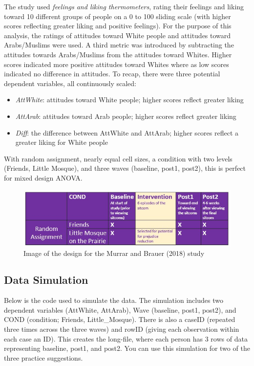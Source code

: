 \documentclass[
  11pt,
]{book}
\providecommand{\tightlist}{%
  \setlength{\itemsep}{0pt}\setlength{\parskip}{0pt}}
\begin{document}
The study used \emph{feelings and liking thermometers}, rating their feelings and liking toward 10 different groups of people on a 0 to 100 sliding scale (with higher scores reflecting greater liking and positive feelings). For the purpose of this analysis, the ratings of attitudes toward White people and attitudes toward Arabs/Muslims were used. A third metric was introduced by subtracting the attitudes towards Arabs/Muslims from the attitudes toward Whites. Higher scores indicated more positive attitudes toward Whites where as low scores indicated no difference in attitudes. To recap, there were three potential dependent variables, all continuously scaled:

\begin{itemize}
\tightlist
\item
  \emph{AttWhite}: attitudes toward White people; higher scores reflect greater liking
\item
  \emph{AttArab}: attitudes toward Arab people; higher scores reflect greater liking
\item
  \emph{Diff}: the difference between AttWhite and AttArab; higher scores reflect a greater liking for White people
\end{itemize}

With random assignment, nearly equal cell sizes, a condition with two levels (Friends, Little Mosque), and three waves (baseline, post1, post2), this is perfect for mixed design ANOVA.

\begin{figure}
\centering
\includegraphics{images/mixed/Murrar_design.jpg}
\caption{Image of the design for the Murrar and Brauer (2018) study}
\end{figure}

\hypertarget{data-simulation-5}{%
\subsection{Data Simulation}\label{data-simulation-5}}

Below is the code used to simulate the data. The simulation includes two dependent variables (AttWhite, AttArab), Wave (baseline, post1, post2), and COND (condition; Friends, Little\_Mosque). There is also a caseID (repeated three times across the three waves) and rowID (giving each observation within each case an ID). This creates the long-file, where each person has 3 rows of data representing baseline, post1, and post2. You can use this simulation for two of the three practice suggestions.
\end{document}
